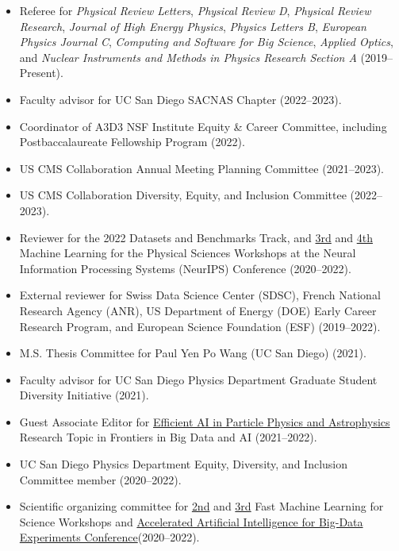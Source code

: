 \documentclass[11pt]{res}
\begin{document}
\begin{resume}
  \begin{itemize}
    \itemsep-0.3em
    \item Referee for \emph{Physical Review Letters}, \emph{Physical Review D}, \emph{Physical Review Research}, \emph{Journal of High Energy Physics}, \emph{Physics Letters B}, \emph{European Physics Journal C}, \emph{Computing and Software for Big Science}, \emph{Applied Optics}, and \emph{Nuclear Instruments and Methods in Physics Research Section A} ({2019--Present}).
    \item Faculty advisor for UC San Diego SACNAS Chapter ({2022--2023}).
    \item Coordinator of A3D3 NSF Institute Equity \& Career Committee, including Postbaccalaureate Fellowship Program ({2022}).
    \item US CMS Collaboration Annual Meeting Planning Committee ({2021--2023}).
    \item US CMS Collaboration Diversity, Equity, and Inclusion Committee ({2022--2023}).
    \item Reviewer for the 2022 Datasets and Benchmarks Track, and \href{https://ml4physicalsciences.github.io/2020/}{3rd} and \href{https://ml4physicalsciences.github.io/2021/}{4th} Machine Learning for the Physical Sciences Workshops at the Neural Information Processing Systems (NeurIPS) Conference ({2020--2022}).
    \item External reviewer for Swiss Data Science Center (SDSC), French National Research Agency (ANR), US Department of Energy (DOE) Early Career Research Program, and European Science Foundation (ESF) ({2019--2022}).
    \item M.S. Thesis Committee for Paul Yen Po Wang (UC San Diego) ({2021}).
    \item Faculty advisor for UC San Diego Physics Department Graduate Student Diversity Initiative ({2021}).
    \item Guest Associate Editor for \href{https://www.frontiersin.org/research-topics/19095/efficient-ai-in-particle-physics-and-astrophysics}{Efficient AI in Particle Physics and Astrophysics} Research Topic in Frontiers in Big Data and AI ({2021--2022}).
    \item UC San Diego Physics Department Equity, Diversity, and Inclusion Committee member ({2020--2022}).
    \item Scientific organizing committee for \href{https://indico.cern.ch/e/fml2020}{2nd} and \href{https://indico.cern.ch/e/fml2022}{3rd} Fast Machine Learning for Science Workshops and \href{http://www.ncsa.illinois.edu/Conferences/AcceleratedAINCSA/}{Accelerated Artificial Intelligence for Big-Data Experiments Conference}({2020--2022}).

\end{itemize}
\end{resume}
\end{document}
